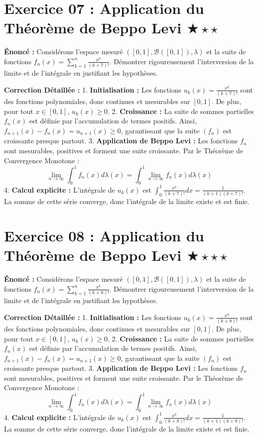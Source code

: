 \documentclass[11pt,a4paper]{article}
\begin{document}
\vspace{1cm}

\section*{Exercice 07 : Application du Théorème de Beppo Levi \quad $\bigstar\star\star$}

\textbf{Énoncé :}
Considérons l'espace mesuré $([0, 1], \mathcal{B}([0, 1]), \lambda)$ et la suite de fonctions $f_n(x) = \sum_{k=1}^n \frac{x^k}{(k+7)!}$.
Démontrer rigoureusement l'interversion de la limite et de l'intégrale en justifiant les hypothèses.

\textbf{Correction Détaillée :}
1. \textbf{Initialisation :}
   Les fonctions $u_k(x) = \frac{x^k}{(k+7)!}$ sont des fonctions polynomiales, donc continues et mesurables sur $[0, 1]$. De plus, pour tout $x \in [0, 1]$, $u_k(x) \ge 0$.
2. \textbf{Croissance :}
   La suite de sommes partielles $f_n(x)$ est définie par l'accumulation de termes positifs. Ainsi, $f_{n+1}(x) - f_n(x) = u_{n+1}(x) \ge 0$, garantissant que la suite $(f_n)$ est croissante presque partout.
3. \textbf{Application de Beppo Levi :}
   Les fonctions $f_n$ sont mesurables, positives et forment une suite croissante. Par le Théorème de Convergence Monotone :
   $$\lim_{n \to \infty} \int_0^1 f_n(x) d\lambda(x) = \int_0^1 \lim_{n \to \infty} f_n(x) d\lambda(x)$$
4. \textbf{Calcul explicite :}
   L'intégrale de $u_k(x)$ est $\int_0^1 \frac{x^k}{(k+7)!} dx = \frac{1}{(k+1)(k+7)!}$.
   La somme de cette série converge, donc l'intégrale de la limite existe et est finie.

\vspace{1cm}

\section*{Exercice 08 : Application du Théorème de Beppo Levi \quad $\bigstar\star\star\star$}

\textbf{Énoncé :}
Considérons l'espace mesuré $([0, 1], \mathcal{B}([0, 1]), \lambda)$ et la suite de fonctions $f_n(x) = \sum_{k=1}^n \frac{x^k}{(k+8)!}$.
Démontrer rigoureusement l'interversion de la limite et de l'intégrale en justifiant les hypothèses.

\textbf{Correction Détaillée :}
1. \textbf{Initialisation :}
   Les fonctions $u_k(x) = \frac{x^k}{(k+8)!}$ sont des fonctions polynomiales, donc continues et mesurables sur $[0, 1]$. De plus, pour tout $x \in [0, 1]$, $u_k(x) \ge 0$.
2. \textbf{Croissance :}
   La suite de sommes partielles $f_n(x)$ est définie par l'accumulation de termes positifs. Ainsi, $f_{n+1}(x) - f_n(x) = u_{n+1}(x) \ge 0$, garantissant que la suite $(f_n)$ est croissante presque partout.
3. \textbf{Application de Beppo Levi :}
   Les fonctions $f_n$ sont mesurables, positives et forment une suite croissante. Par le Théorème de Convergence Monotone :
   $$\lim_{n \to \infty} \int_0^1 f_n(x) d\lambda(x) = \int_0^1 \lim_{n \to \infty} f_n(x) d\lambda(x)$$
4. \textbf{Calcul explicite :}
   L'intégrale de $u_k(x)$ est $\int_0^1 \frac{x^k}{(k+8)!} dx = \frac{1}{(k+1)(k+8)!}$.
   La somme de cette série converge, donc l'intégrale de la limite existe et est finie.
\end{document}
